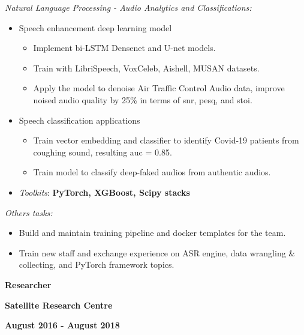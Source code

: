 \documentclass[10pt]{article}
\begin{document}
        \emph{Natural Language Processing - Audio Analytics and Classifications:}
        \vspace{-2.5mm}
        \begin{itemize}[noitemsep]
            \item Speech enhancement deep learning model
                \begin{itemize}[noitemsep]
                    \item Implement bi-LSTM Densenet and U-net models.
                    \item Train with LibriSpeech, VoxCeleb, Aishell, MUSAN datasets.
                    \item Apply the model to denoise Air Traffic Control Audio data, improve noised audio quality by 25\% in terms of snr, pesq, and stoi.
                \end{itemize}
            \item Speech classification applications
                \begin{itemize}[noitemsep]
                    \item Train vector embedding and classifier to identify Covid-19 patients from coughing sound, resulting auc = 0.85.
                    \item Train model to classify deep-faked audios from authentic audios.
                \end{itemize}
            \item \emph{Toolkits}: \textbf{PyTorch, XGBoost, Scipy stacks}
        \end{itemize}


        \emph{Others tasks:}
        \vspace{-2.5mm}
        \begin{itemize}[noitemsep]
            \item Build and maintain training pipeline and docker templates for the team.
            \item Train new staff and exchange experience on ASR engine, data wrangling \& collecting, and PyTorch framework topics.
        \end{itemize}

        \begin{multicols}{3}
            \begin{flushleft}
                \textbf{Researcher}
            \end{flushleft}

            \columnbreak

            \begin{center}
                \textbf{Satellite Research Centre}
            \end{center}

            \columnbreak

            \begin{flushright}
                \textbf{August 2016 - August 2018}
            \end{flushright}
        \end{multicols}
\end{document}
